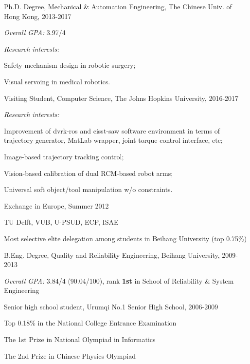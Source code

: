 \documentclass[10pt,letterpaper]{article}
\renewenvironment{itemize}{
\begin{list}{}{
    \setlength{\leftmargin}{1.5em}
    \setlength{\itemsep}{0.25em}
    \setlength{\parskip}{0pt}
    \setlength{\parsep}{0.25em}
    }
    }{
\end{list}
}
\begin{document}
\begin{itemize}
    \item Ph.D. Degree, Mechanical \& Automation Engineering, The Chinese Univ. of Hong Kong, 2013-2017
    \begin{itemize}
        \item \emph{Overall GPA:} 3.97/4
        \item \emph{Research interests:}
        \begin{itemize}
            \item Safety mechanism design in robotic surgery;
            \item Visual servoing in medical robotics.
        \end{itemize}
    \end{itemize}
    \item Visiting Student, Computer Science, The Johns Hopkins University, 2016-2017
    \begin{itemize}
        \item \emph{Research interests:}
        \begin{itemize}
            \item Improvement of dvrk-ros and cisst-saw software environment in terms of trajectory generator, MatLab wrapper, joint torque control interface, etc;
            \item Image-based trajectory tracking control;
            \item Vision-based calibration of dual RCM-based robot arms;
            \item Universal soft object/tool manipulation w/o constraints.
        \end{itemize}
    \end{itemize}
    \item Exchange in Europe, Summer 2012
    \begin{itemize}
        \item TU Delft, VUB, U-PSUD, ECP, ISAE
        \item Most selective elite delegation among students in Beihang University (top 0.75\%)
    \end{itemize}
    \item B.Eng. Degree, Quality and Reliability Engineering, Beihang University, 2009-2013
    \begin{itemize}
        \item \emph{Overall GPA:} 3.84/4 (90.04/100), rank \textbf{1st} in School of Reliability \& System Engineering
    \end{itemize}
    \item Senior high school student, Urumqi No.1 Senior High School, 2006-2009
    \begin{itemize}
        \item Top 0.18\% in the National College Entrance Examination
        \item The 1st Prize in National Olympiad in Informatics
        \item The 2nd Prize in Chinese Physics Olympiad
    \end{itemize}
\end{itemize}
\end{document}
